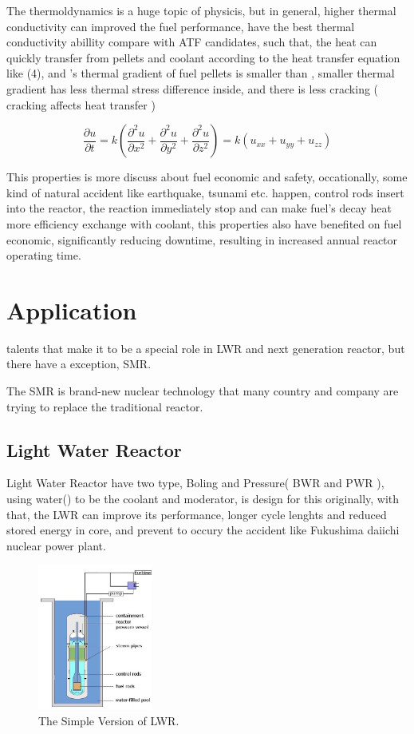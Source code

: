 \documentclass[final,10pt,times,twocolumn]{elsarticle}
\begin{document}
The thermoldynamics is a huge topic of physicis, but in general, higher thermal conductivity can improved the fuel performance,  have the best thermal conductivity abillity compare with ATF candidates, such that, the heat can quickly transfer from pellets and coolant according to the heat transfer equation like (4), and 's thermal gradient of fuel pellets is smaller than , smaller thermal gradient has less thermal stress difference inside, and there is less cracking ( cracking affects heat transfer )

\begin{equation}
    \frac{\partial u}{\partial t} = k \left( \frac{\partial^2 u}{\partial x^2} + \frac{\partial^2 u}{\partial y^2} + \frac{\partial^2 u}{\partial z^2} \right) = k(u_{xx} + u_{yy} + u_{zz})
\end{equation}

This properties is more discuss about fuel economic and safety, occationally, some kind of natural accident like earthquake, tsunami etc. happen, control rods insert into the reactor, the reaction immediately stop and can  make fuel's decay heat more efficiency exchange with coolant, this properties also have benefited on fuel economic, significantly reducing downtime, resulting in increased annual reactor operating time.

\section{Application}
 talents that make it to be a special role in LWR and next generation reactor, but there have a exception, SMR.

The SMR is brand-new nuclear technology that many country and company are trying to replace the traditional reactor. 

\subsection{Light Water Reactor}
Light Water Reactor have two type, Boling and Pressure( BWR and PWR ), using water() to be the coolant and moderator,  is design for this originally, with that, the LWR can improve its performance, longer cycle lenghts and reduced stored energy in core, and prevent to occury the accident like Fukushima daiichi nuclear power plant.

\begin{figure}[ht]
    \centering
    \includegraphics[width = 3.75cm]{Pumpless_light_water_reactor.jpg}
    \caption{The Simple Version of LWR. \cite{wiki:Light-water_reactor} }
\end{figure}
\end{document}
